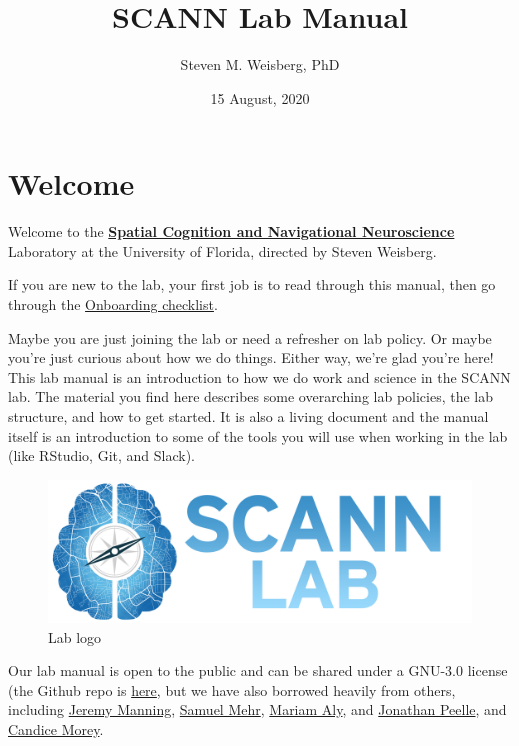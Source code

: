 \documentclass[
  12pt,
]{book}
\title{SCANN Lab Manual}
\author{Steven M. Weisberg, PhD}
\date{15 August, 2020}
\begin{document}
\maketitle

{
\hypersetup{linkcolor=}
\setcounter{tocdepth}{1}
\tableofcontents
}
\hypertarget{welcome}{%
\chapter{Welcome}\label{welcome}}

Welcome to the \href{https://scannlab.psych.ufl.edu}{\textbf{Spatial Cognition and Navigational Neuroscience}} Laboratory at the University of Florida, directed by Steven Weisberg.

If you are new to the lab, your first job is to read through this manual, then go through the \href{onboarding}{Onboarding checklist}.

Maybe you are just joining the lab or need a refresher on lab policy. Or maybe you're just curious about how we do things. Either way, we're glad you're here! This lab manual is an introduction to how we do work and science in the SCANN lab. The material you find here describes some overarching lab policies, the lab structure, and how to get started. It is also a living document and the manual itself is an introduction to some of the tools you will use when working in the lab (like RStudio, Git, and Slack).

\begin{figure}
\centering
\includegraphics{./SCANN_Lab_Logo_NoOutline_With_Text.png}
\caption{Lab logo}
\end{figure}

Our lab manual is open to the public and can be shared under a GNU-3.0 license (the Github repo is \href{https://github.com/scann-lab/lab_manual}{here}, but we have also borrowed heavily from others, including \href{https://github.com/ContextLab/lab-manual}{Jeremy Manning}, \href{https://handbook-public.themusiclab.org/welcome}{Samuel Mehr}, \href{https://github.com/alylab/labmanual}{Mariam Aly}, and \href{https://github.com/jpeelle/peellelab_manual/}{Jonathan Peelle}, and \href{https://ccmorey.github.io/labHandbook/}{Candice Morey}.
\end{document}
